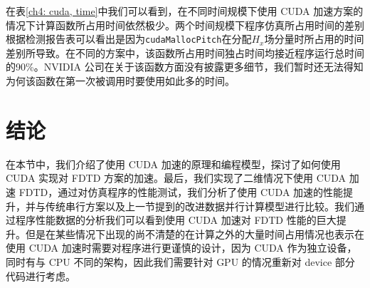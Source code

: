 在表\ref{ch4: cuda, time}中我们可以看到，在不同时间规模下使用 CUDA 加速方案的情况下计算函数所占用时间依然极少。两个时间规模下程序仿真所占用时间的差别根据检测报告表可以看出是因为\lstinline|cudaMallocPitch|在分配$H_x$场分量时所占用的时间差别所导致。在不同的方案中，该函数所占用时间独占时间均接近程序运行总时间的90\%。NVIDIA 公司在关于该函数方面没有披露更多细节，我们暂时还无法得知为何该函数在第一次被调用时要使用如此多的时间。

\section{结论}

在本节中，我们介绍了使用 CUDA 加速的原理和编程模型，探讨了如何使用 CUDA 实现对 FDTD 方案的加速。最后，我们实现了二维情况下使用 CUDA 加速 FDTD，通过对仿真程序的性能测试，我们分析了使用 CUDA 加速的性能提升，并与传统串行方案以及上一节提到的改进数据并行计算模型进行比较。我们通过程序性能数据的分析我们可以看到使用 CUDA 加速对 FDTD 性能的巨大提升。但是在某些情况下出现的尚不清楚的在计算之外的大量时间占用情况也表示在使用 CUDA 加速时需要对程序进行更谨慎的设计，因为 CUDA 作为独立设备，同时有与 CPU 不同的架构，因此我们需要针对 GPU 的情况重新对 device 部分代码进行考虑。